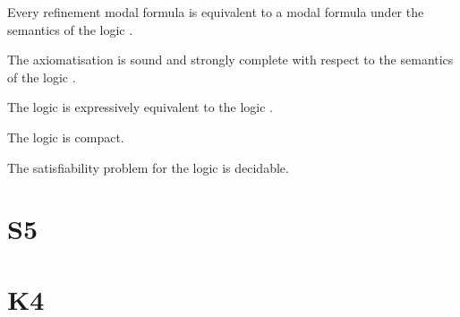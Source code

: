 \begin{lemma}
Every refinement modal formula is equivalent to a modal formula under the semantics of the logic \logicRmlKD{}.
\end{lemma}


\begin{theorem}
The axiomatisation \axiomRmlKD{} is sound and strongly complete with respect to the semantics of the logic \logicRmlKD{}.
\end{theorem}


\begin{corollary}
The logic \logicRmlKD{} is expressively equivalent to the logic \logicKD{}.
\end{corollary}

\begin{corollary}
The logic \logicRmlKD{} is compact.
\end{corollary}

\begin{corollary}
The satisfiability problem for the logic \logicRmlKD{} is decidable.
\end{corollary}

\section{S5}

\section{K4}

